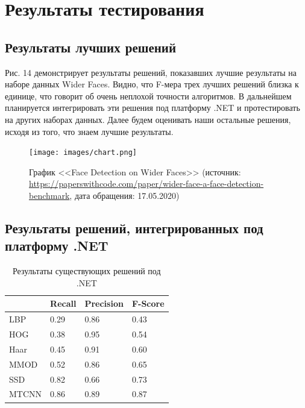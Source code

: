 \documentclass[14pt]{matmex-diploma-custom}
\begin{document}
    \section{Результаты тестирования}
        \subsection{Результаты лучших решений}
        Рис. 14 демонстрирует результаты решений, показавших лучшие результаты на наборе данных Wider Faces. Видно, что F-мера трех лучших решений близка к единице, что говорит об очень неплохой точности алгоритмов. В дальнейшем планируется интегрировать эти решения под платформу .NET и протестировать на других наборах данных. Далее будем оценивать наши остальные решения, исходя из того, что знаем лучшие результаты.
        
            \begin{figure}[H]
                        \centering
                        \texttt{[image: images/chart.png]}
                        \caption{График <<Face Detection on Wider Faces>> (источник: \url{https://paperswithcode.com/paper/wider-face-a-face-detection-benchmark}, дата обращения: 17.05.2020)}
           \end{figure} 
        
        \subsection{Результаты решений, интегрированных под платформу .NET}
                \begin{table}[H]
                \centering 
\begin{tabular}{|l|l|l|l|}
\hline
                              & \cellcolor[HTML]{CBCEFB}Recall & \cellcolor[HTML]{CBCEFB}Precision & \cellcolor[HTML]{CBCEFB}F-Score \\ \hline
\cellcolor[HTML]{CBCEFB}LBP   & 0.29                           & 0.86                              & 0.43                            \\ \hline
\cellcolor[HTML]{CBCEFB}HOG   & 0.38                           & 0.95                              & 0.54                            \\ \hline
\cellcolor[HTML]{CBCEFB}Haar  & 0.45                           & 0.91                              & 0.60                            \\ \hline
\cellcolor[HTML]{CBCEFB}MMOD  & 0.52                           & 0.86                              & 0.65                            \\ \hline
\cellcolor[HTML]{CBCEFB}SSD   & 0.82                           & 0.66                              & 0.73                            \\ \hline
\cellcolor[HTML]{CBCEFB}MTCNN & 0.86                           & 0.89                              & 0.87                            \\ \hline
\end{tabular}
\caption{Результаты существующих решений под .NET}
\end{table}
    
\end{document}
